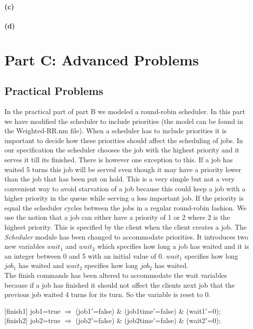 \documentclass[12pt]{report}
\begin{document}
\subsubsection*{(c)}

\subsubsection*{(d)}

\chapter*{Part C: Advanced Problems}
\section*{Practical Problems}
In the practical part of part B we modeled a round-robin scheduler. In this part we have modified the scheduler to include priorities (the model can be found in the Weighted-RR.nm file). When a scheduler has to include priorities it is important to decide how these priorities should affect the scheduling of jobs. In our specification the scheduler chooses the job with the highest priority and it serves it till its finished. There is however one exception to this. If a job has waited 5 turns this job will be served even though it may have a priority lower than the job that has been put on hold. This is a very simple but not a very convenient way to avoid starvation of a job because this could keep a job with a higher priority in the queue while serving a less important job. If the priority is equal the scheduler cycles between the jobs in a regular round-robin fashion. We use the notion that a job can either have a priority of 1 or 2 where 2 is the highest priority. This is specified by the client when the client creates a job. The \emph{Scheduler} module has been changed to accommodate priorities. It introduces two new variables $wait_1$ and $wait_2$ which specifies how long a job has waited and it is an integer between 0 and 5 with an initial value of 0. $wait_1$ specifies how long $job_1$ has waited and $wait_2$ specifies how long $job_2$ has waited.\\
The finish commands has been altered to accommodate the wait variables because if a job has finished it should not affect the clients next job that the previous job waited 4 turns for its turn. So the variable is reset to 0.\\
\begin{center}
{[finish1]} job1=true $\Rightarrow$ (job1$'$=false) \& (job1time$'$=false) \& (wait1$'$=0);\\
{[finish2]} job2=true $\Rightarrow$ (job2$'$=false) \& (job2time$'$=false) \& (wait2$'$=0);
\end{center}
\end{document}
